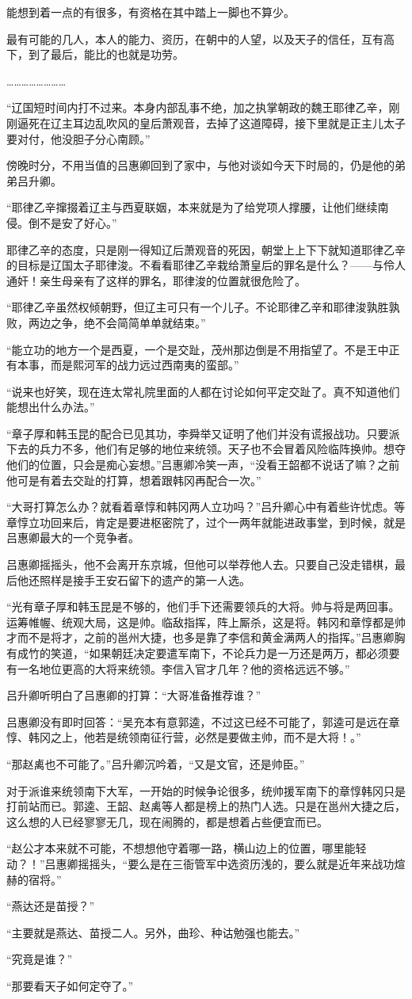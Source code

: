 能想到着一点的有很多，有资格在其中踏上一脚也不算少。

最有可能的几人，本人的能力、资历，在朝中的人望，以及天子的信任，互有高下，到了最后，能比的也就是功劳。

……………………

“辽国短时间内打不过来。本身内部乱事不绝，加之执掌朝政的魏王耶律乙辛，刚刚逼死在辽主耳边乱吹风的皇后萧观音，去掉了这道障碍，接下里就是正主儿太子要对付，他没胆子分心南顾。”

傍晚时分，不用当值的吕惠卿回到了家中，与他对谈如今天下时局的，仍是他的弟弟吕升卿。

“耶律乙辛撺掇着辽主与西夏联姻，本来就是为了给党项人撑腰，让他们继续南侵。倒不是安了好心。”

耶律乙辛的态度，只是刚一得知辽后萧观音的死因，朝堂上上下下就知道耶律乙辛的目标是辽国太子耶律浚。不看看耶律乙辛栽给萧皇后的罪名是什么？——与伶人通奸！亲生母亲有了这样的罪名，耶律浚的位置就很危险了。

“耶律乙辛虽然权倾朝野，但辽主可只有一个儿子。不论耶律乙辛和耶律浚孰胜孰败，两边之争，绝不会简简单单就结束。”

“能立功的地方一个是西夏，一个是交趾，茂州那边倒是不用指望了。不是王中正有本事，而是熙河军的战力远过西南夷的蛮部。”

“说来也好笑，现在连太常礼院里面的人都在讨论如何平定交趾了。真不知道他们能想出什么办法。”

“章子厚和韩玉昆的配合已见其功，李舜举又证明了他们并没有谎报战功。只要派下去的兵力不多，他们有足够的地位来统领。天子也不会冒着风险临阵换帅。想夺他们的位置，只会是痴心妄想。”吕惠卿冷笑一声，“没看王韶都不说话了嘛？之前他可是有着去交趾的打算，想着跟韩冈再配合一次。”

“大哥打算怎么办？就看着章惇和韩冈两人立功吗？”吕升卿心中有着些许忧虑。等章惇立功回来后，肯定是要进枢密院了，过个一两年就能进政事堂，到时候，就是吕惠卿最大的一个竞争者。

吕惠卿摇摇头，他不会离开东京城，但他可以举荐他人去。只要自己没走错棋，最后他还照样是接手王安石留下的遗产的第一人选。

“光有章子厚和韩玉昆是不够的，他们手下还需要领兵的大将。帅与将是两回事。运筹帷幄、统观大局，这是帅。临敌指挥，阵上厮杀，这是将。韩冈和章惇都是帅才而不是将才，之前的邕州大捷，也多是靠了李信和黄金满两人的指挥。”吕惠卿胸有成竹的笑道，“如果朝廷决定要遣军南下，不论兵力是一万还是两万，都必须要有一名地位更高的大将来统领。李信入官才几年？他的资格远远不够。”

吕升卿听明白了吕惠卿的打算：“大哥准备推荐谁？”

吕惠卿没有即时回答：“吴充本有意郭逵，不过这已经不可能了，郭逵可是远在章惇、韩冈之上，他若是统领南征行营，必然是要做主帅，而不是大将！。”

“那赵禼也不可能了。”吕升卿沉吟着，“又是文官，还是帅臣。”

对于派谁来统领南下大军，一开始的时候争论很多，统帅援军南下的章惇韩冈只是打前站而已。郭逵、王韶、赵禼等人都是榜上的热门人选。只是在邕州大捷之后，这么想的人已经寥寥无几，现在闹腾的，都是想着占些便宜而已。

“赵公才本来就不可能，不想想他守着哪一路，横山边上的位置，哪里能轻动？！”吕惠卿摇摇头，“要么是在三衙管军中选资历浅的，要么就是近年来战功煊赫的宿将。”

“燕达还是苗授？”

“主要就是燕达、苗授二人。另外，曲珍、种诂勉强也能去。”

“究竟是谁？”

“那要看天子如何定夺了。”

